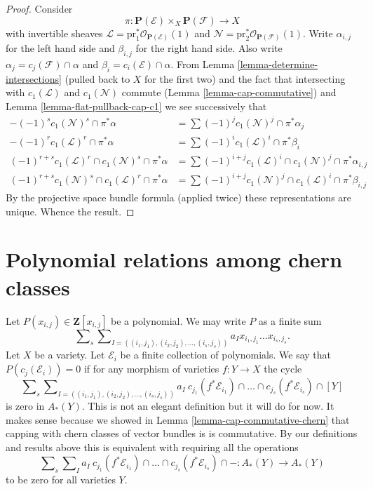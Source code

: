 \begin{proof}
Consider
$$
\pi : \mathbf{P}(\mathcal{E}) \times_X \mathbf{P}(\mathcal{F})
\longrightarrow
X
$$
with invertible sheaves
$\mathcal{L} = \text{pr}_1^*\mathcal{O}_{\mathbf{P}(\mathcal{E})}(1)$
and
$\mathcal{N} = \text{pr}_2^*\mathcal{O}_{\mathbf{P}(\mathcal{F})}(1)$.
Write $\alpha_{i, j}$ for the left hand side and $\beta_{i, j}$
for the right hand side. Also write
$\alpha_j = c_j(\mathcal{F}) \cap \alpha$ and 
$\beta_i = c_i(\mathcal{E}) \cap \alpha$.
From Lemma \ref{lemma-determine-intersections}
(pulled back to $X$ for the first two)
and the fact that intersecting with $c_1(\mathcal{L})$ and
$c_1(\mathcal{N})$ commute (Lemma \ref{lemma-cap-commutative})
and Lemma \ref{lemma-flat-pullback-cap-c1}
we see successively that
\begin{align*}
-(-1)^s c_1(\mathcal{N})^s \cap \pi^*\alpha
& =
\sum (-1)^j c_1(\mathcal{N})^j \cap \pi^*\alpha_j \\
-(-1)^r c_1(\mathcal{L})^r \cap \pi^*\alpha
& =
\sum (-1)^i c_1(\mathcal{L})^i \cap \pi^*\beta_i \\
(-1)^{r + s}c_1(\mathcal{L})^r \cap c_1(\mathcal{N})^s \cap \pi^*\alpha
& =
\sum
(-1)^{i + j}
c_1(\mathcal{L})^i \cap c_1(\mathcal{N})^j \cap \pi^*\alpha_{i, j} \\
(-1)^{r + s}c_1(\mathcal{N})^s \cap c_1(\mathcal{L})^r \cap \pi^*\alpha
& =
\sum
(-1)^{i + j}
c_1(\mathcal{N})^j \cap c_1(\mathcal{L})^i \cap \pi^*\beta_{i, j}
\end{align*}
By the projective space bundle formula (applied twice) these representations
are unique. Whence the result.
\end{proof}









\section{Polynomial relations among chern classes}
\label{section-relations-chern-classes}

\noindent
Let $P(x_{i, j}) \in \mathbf{Z}[x_{i, j}]$ be a polynomial.
We may write $P$ as a finite sum
$$
\sum\nolimits_s
\sum\nolimits_{I = ((i_1, j_1), (i_2, j_2), \ldots, (i_s, j_s))}
a_I x_{i_1, j_1} \ldots x_{i_s, j_s}.
$$
Let $X$ be a variety. Let $\mathcal{E}_i$ be a finite collection
of polynomials. We say that $P(c_j(\mathcal{E}_i)) = 0$
if for any morphism of varieties $f : Y \to X$ the cycle
$$
\sum\nolimits_s
\sum\nolimits_{I = ((i_1, j_1), (i_2, j_2), \ldots, (i_s, j_s))}
a_I\ c_{j_1}(f^*\mathcal{E}_{i_1}) \cap \ldots
\cap c_{j_s}(f^*\mathcal{E}_{i_s}) \cap [Y]
$$
is zero in $A_*(Y)$. This is not an elegant definition but it will do
for now. It makes sense because we showed in
Lemma \ref{lemma-cap-commutative-chern} that
capping with chern classes of vector bundles is is commutative.
By our definitions and results above
this is equivalent with requiring all the
operations
$$
\sum\nolimits_s
\sum\nolimits_I
a_I\ c_{j_1}(f^*\mathcal{E}_{i_1}) \cap \ldots
\cap c_{j_s}(f^*\mathcal{E}_{i_s}) \cap - :
A_*(Y) \to A_*(Y)
$$
to be zero for all varieties $Y$.

